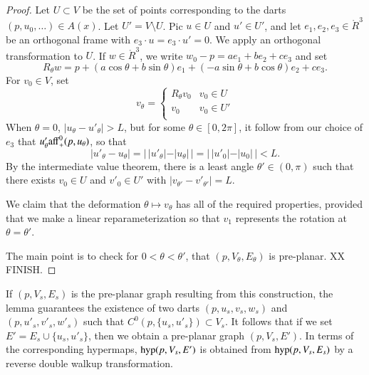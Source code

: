 \begin{proof}
Let $U\subset V$ be the set of points corresponding
to the darts $(p,u_0,\ldots)\in A(x)$.  Let $U'=V\setminus U$.
Pic $u\in U$ and $u'\in U'$, and let $e_1,e_2,e_3\in\ring{R}^3$ be 
an orthogonal frame with $e_3\cdot u = e_3\cdot u' = 0$.
We apply an orthogonal transformation to $U$.
If $w\in\ring{R}^3$, we write
$w_0-p = a e_1 + b e_2 + c e_3$ and set
$$R_\theta w = p + (a\cos\theta+b\sin\theta) e_1 +
   (-a\sin\theta+b\cos\theta) e_2 + c e_3.$$
For $v_0\in V$, set
  $$
  v_\theta = \begin{cases}
    R_\theta v_0 & v_0\in U\\
    v_0 & v_0\in U'\\
    \end{cases}
  $$
When $\theta=0$, $|u_\theta-u'_\theta|>L$, but for some $\theta\in[0,2\pi]$,
it follow from our choice of $e_3$ that
$u'_\theta{\operatorname{aff}}_+^0(p,u_\theta)$, so that
$$|u'_\theta - u_\theta| = |\,|u'_\theta| - |u_\theta|\,|
  = |\,|u'_0| - |u_0|\,| < L.$$
By the intermediate value theorem, there is a least angle
$\theta'\in(0,\pi)$ such that there exists $v_0\in U$
and $v'_0\in U'$ with $|v_{\theta'}-v'_{\theta'}|=L$.

We claim that the deformation $\theta\mapsto v_\theta$
has all of the required properties, provided that we make
a linear reparameterization so that $v_1$ represents the
rotation at $\theta=\theta'$.

The main point is to check for $0 < \theta < \theta'$,
that $(p,V_\theta,E_\theta)$ is pre-planar.
XX FINISH.
\end{proof}

If $(p,V_s,E_s)$ is the pre-planar graph resulting from
this construction, the lemma guarantees the existence
of two darts $(p,u_s,v_s,w_s)$ and $(p,u'_s,v'_s,w'_s)$
such that $C^0(p,\{u_s,u'_s\})\subset V_s$.  It follows
that if we set $E' = E_s \cup \{u_s,u'_s\}$, then we obtain
a pre-planar graph $(p,V_s,E')$.  In terms of the 
corresponding hypermaps, ${\operatorname{hyp}}(p,V_s,E')$ is obtained from
${\operatorname{hyp}}(p,V_s,E_s)$ by a reverse double walkup transformation.

